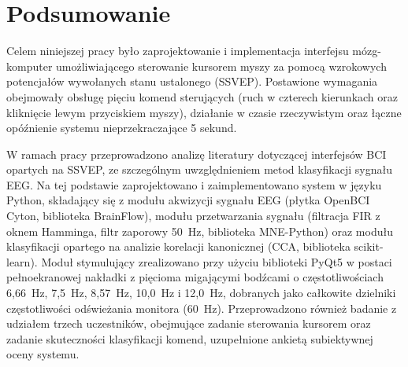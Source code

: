 %


\chapter*{Podsumowanie}

Celem niniejszej pracy było zaprojektowanie i implementacja interfejsu
mózg-komputer umożliwiającego sterowanie kursorem myszy za pomocą
wzrokowych potencjałów wywołanych stanu ustalonego (SSVEP).
Postawione wymagania obejmowały obsługę pięciu komend sterujących
(ruch w czterech kierunkach oraz kliknięcie lewym przyciskiem myszy),
działanie w czasie rzeczywistym oraz łączne opóźnienie systemu
nieprzekraczające 5 sekund.

W ramach pracy przeprowadzono analizę literatury dotyczącej interfejsów
BCI opartych na SSVEP, ze szczególnym uwzględnieniem metod klasyfikacji
sygnału EEG. Na tej podstawie zaprojektowano i zaimplementowano system
w języku Python, składający się z modułu akwizycji sygnału EEG
(płytka OpenBCI Cyton, biblioteka BrainFlow), modułu przetwarzania
sygnału (filtracja FIR z oknem Hamminga, filtr zaporowy 50~Hz,
biblioteka MNE-Python) oraz modułu klasyfikacji opartego na analizie
korelacji kanonicznej (CCA, biblioteka scikit-learn). Moduł stymulujący
zrealizowano przy użyciu biblioteki PyQt5 w postaci pełnoekranowej
nakładki z pięcioma migającymi bodźcami o częstotliwościach 6,66~Hz,
7,5~Hz, 8,57~Hz, 10,0~Hz i 12,0~Hz, dobranych jako całkowite
dzielniki częstotliwości odświeżania monitora (60~Hz).
Przeprowadzono również badanie z udziałem trzech uczestników,
obejmujące zadanie sterowania kursorem oraz zadanie skuteczności
klasyfikacji komend, uzupełnione ankietą subiektywnej oceny systemu.


